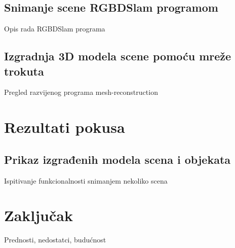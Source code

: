 \documentclass{beamer}
\begin{document}
\subsection{Snimanje scene RGBDSlam programom} 
\begin{frame}{Opis rada RGBDSlam programa}

\end{frame}

\subsection{Izgradnja 3D modela scene pomoću mreže trokuta} 
\begin{frame}{Pregled razvijenog programa mesh-reconstruction}
    
\end{frame}

\section{Rezultati pokusa} 
\subsection{Prikaz izgrađenih modela scena i objekata}
\begin{frame}{Ispitivanje funkcionalnosti snimanjem nekoliko scena}

\end{frame}

\section{Zaključak} 
\begin{frame}{Prednosti, nedostatci, budućnost}

\end{frame}
\end{document}
